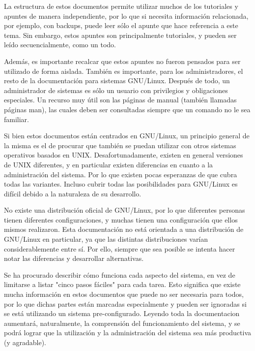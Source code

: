 
La estructura de estos documentos permite utilizar muchos de los tutoriales y apuntes
de manera independiente, por lo que si necesita información relacionada, por ejemplo,
con backups, 
puede leer sólo el apunte que hace referencia a este tema. 
Sin embargo, estos apuntes son principalmente tutoriales,
y pueden ser leído secuencialmente, como un todo.

Además, es importante recalcar que estos apuntes no fueron
pensados para ser utilizado de forma aislada. También
es importante, para los administradores, el resto de la documentación
para sistemas GNU/Linux. Después de todo, un administrador de sistemas es sólo
un usuario con privilegios y obligaciones especiales. Un recurso muy útil son
las páginas de manual (también llamadas páginas man), las cuales deben ser
consultadas siempre que un comando no le sea familiar.  

Si bien estos documentos están centrados en GNU/Linux, un principio general de la
misma es el de procurar que también se puedan utilizar con otros sistemas
operativos basados en UNIX. Desafortunadamente, existen en
general versiones de UNIX diferentes, y en
particular existen diferencias en cuanto a la administración del sistema. 
Por lo que existen pocas esperanzas de que
cubra todas las variantes. Incluso cubrir todas las posibilidades para GNU/Linux
es difícil debido a la naturaleza de su desarrollo.  

No existe una distribución oficial de GNU/Linux, por lo que diferentes
personas tienen diferentes configuraciones, y muchas tienen una configuración
que ellos mismos realizaron. Esta documentación no está orientada a una distribución de
GNU/Linux en particular, ya que las distintas distribuciones varían
considerablemente entre sí. Por ello, siempre que sea posible se intenta hacer
notar las diferencias y desarrollar alternativas.

Se ha procurado describir cómo funciona cada aspecto del sistema, en vez
de limitarse a listar "cinco pasos fáciles" para cada tarea. Esto significa que
existe
mucha información en estos documentos que puede no ser necesaria para todos, por lo
que dichas partes están marcadas especialmente y pueden ser
ignoradas si se está utilizando un sistema pre-configurado. Leyendo toda la documentacion
aumentará, naturalmente, la comprensión del funcionamiento del sistema, y se
podrá lograr que la utilización y la administración del sistema sea más
productiva (y agradable).

